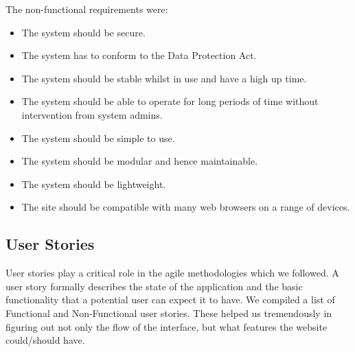 \documentclass{l3proj}
\begin{document}
The non-functional requirements were:
\begin{itemize}
\item The system should be secure.
\item The system has to conform to the Data Protection Act.
\item The system should be stable whilst in use and have a high up time.
\item The system should be able to operate for long periods of time without intervention from system admins.
\item The system should be simple to use.
\item The system should be modular and hence maintainable.
\item The system should be lightweight.
\item The site should be compatible with many web browsers on a range of devices.

\end{itemize}

\subsection{User Stories}
\label{user_stories}

User stories \cite{UserStories} play a critical role in the agile methodologies which we followed. A user story formally describes the state of the application and the basic functionality that a potential user can expect it to have. We compiled a list of Functional and Non-Functional user stories. These helped us tremendously in figuring out not only the flow of the interface, but what features the website could/should have.
\end{document}
